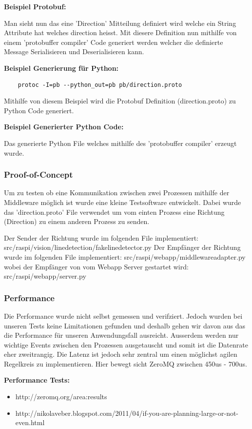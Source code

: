 \documentclass[../../main.tex]{subfiles}
\begin{document}
\textbf{Beispiel Protobuf:}

Man sieht nun das eine 'Direction' Mitteilung definiert wird welche ein String Attribute hat welches direction heisst. Mit diesere Definition
nun mithilfe von einem 'protobuffer compiler' Code generiert werden welcher die definierte Message Serialisieren und Deserialisieren kann.

\textbf{Beispiel Generierung für Python:}
\begin{lstlisting}
    protoc -I=pb --python_out=pb pb/direction.proto
\end{lstlisting}
Mithilfe von diesem Beispiel wird die Protobuf Definition (direction.proto) zu Python Code generiert.

\textbf{Beispiel Generierter Python Code:}

Das generierte Python File welches mithilfe des 'protobuffer compiler' erzeugt wurde.

\subsubsection{Proof-of-Concept}
Um zu testen ob eine Kommunikation zwischen zwei Prozessen mithilfe der Middleware möglich ist wurde eine kleine Testsoftware entwickelt.
Dabei wurde das 'direction.proto' File verwendet um vom einten Prozess eine Richtung (Direction) zu einem anderen Prozess zu senden.

Der Sender der Richtung wurde im folgenden File implementiert: src/raspi/vision/linedetection/fakelinedetector.py
Der Empfänger der Richtung wurde im folgenden File implementiert: src/raspi/webapp/middlewareadapter.py
wobei der Empfänger von vom Webapp Server gestartet wird: src/raspi/webapp/server.py

\subsubsection{Performance}
Die Performance wurde nicht selbst gemessen und verifziert. Jedoch wurden bei unseren Tests keine Limitationen gefunden und deshalb gehen wir davon aus
das die Performance für unseren Anwendungsfall ausreicht. Ausserdem werden nur wichtige Events zwischen den Prozessen ausgetauscht und somit ist die Datenrate
eher zweitrangig. Die Latenz ist jedoch sehr zentral um einen möglichst agilen Regelkreis zu implementieren. Hier bewegt sicht ZeroMQ zwischen 450us - 700us.

\textbf{Performance Tests:}
\begin{itemize}
    \item http://zeromq.org/area:results
    \item http://nikolaveber.blogspot.com/2011/04/if-you-are-planning-large-or-not-even.html
\end{itemize}
\end{document}
